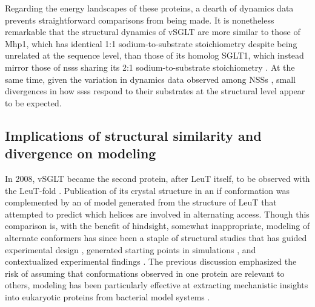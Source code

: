 Regarding the energy landscapes of these proteins, a dearth of dynamics data prevents straightforward comparisons from being made. It is nonetheless remarkable that the structural dynamics of vSGLT are more similar to those of Mhp1, which has identical 1:1 sodium-to-substrate stoichiometry despite being unrelated at the sequence level, than those of its homolog SGLT1, which instead mirror those of \gls{nss}s sharing its 2:1 sodium-to-substrate stoichiometry \citep*{Kazmier2014, Loo1998, Paz2018}. At the same time, given the variation in dynamics data observed among NSSs \citep*{Adhikary2017, Kazmier2014a, Merkle2018, Moeller2019}, small divergences in how \gls{sss}s respond to their substrates at the structural level appear to be expected.

\subsection{Implications of structural similarity and divergence on modeling}\label{sec:leutintro_modeling}

In 2008, vSGLT became the second protein, after LeuT itself, to be observed with the LeuT-fold \citep*{Faham2008}. Publication of its crystal structure in an \gls{if} conformation was complemented by an \gls{of} model generated from the structure of LeuT that attempted to predict which helices are involved in alternating access. Though this comparison is, with the benefit of hindsight, somewhat inappropriate, modeling of alternate conformers has since been a staple of structural studies that has guided experimental design \citep*{Geier2013, Gotfryd2020, Paz2018, Napolitano2017, Ylikangas2014}, generated starting points in simulations \citep*{Bisignano2018, Kelashvilli2015, Razavi2018}, and contextualized experimental findings \citep*{Kazmier2014a, Paz2018, Terry2018}. The previous discussion emphasized the risk of assuming that conformations observed in one protein are relevant to others, modeling has been particularly effective at extracting mechanistic insights into eukaryotic proteins from bacterial model systems \citep*{Bisignano2018, Forrest2008, Forrest2007, Geier2013, Wang2013, Zomot2007}.

